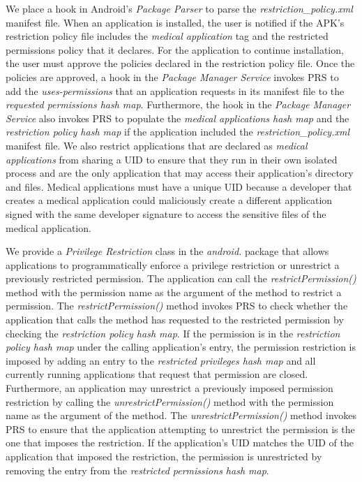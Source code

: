 We place a hook in Android's \textit{Package Parser} to parse the
\textit{restriction\_policy.xml} manifest file. When an application is
installed, the user is notified if the APK's restriction policy file includes
the \textit{medical application} tag and the restricted permissions policy that
it declares. For the application to continue installation, the user must
approve the policies declared in the restriction policy file.  Once the
policies are approved, a hook in the \textit{Package Manager Service} invokes
PRS to add the \textit{uses-permissions} that an application requests in its
manifest file to the \textit{requested permissions hash map}.  Furthermore, the
hook in the \textit{Package Manager Service} also invokes PRS to populate the
\textit{medical applications hash map} and the \textit{restriction policy hash
map} if the application included the \textit{restriction\_policy.xml} manifest
file.  We also restrict applications that are declared as \textit{medical
applications} from sharing a UID to ensure that they run in their own isolated
process and are the only application that may access their application's
directory and files.  Medical applications must have a unique UID because a
developer that creates a medical application could maliciously create a
different application signed with the same developer signature to access the
sensitive files of the medical application.

We provide a \textit{Privilege Restriction} class in the \textit{android.}
package that allows applications to programmatically enforce a privilege
restriction or unrestrict a previously restricted permission.  The application
can call the \textit{restrictPermission()} method with the permission name as
the argument of the method to restrict a permission.  The
\textit{restrictPermission()} method invokes PRS to check whether the
application that calls the method has requested to the restricted permission by
checking the \textit{restriction policy hash map}.  If the permission is in the
\textit{restriction policy hash map} under the calling application's entry, the
permission restriction is imposed by adding an entry to the \textit{restricted
privileges hash map} and all currently running applications that request that
permission are closed.  Furthermore, an application may unrestrict a previously
imposed permission restriction by calling the \textit{unrestrictPermission()}
method with the permission name as the argument of the method.  The
\textit{unrestrictPermission()} method invokes PRS to ensure that the
application attempting to unrestrict the permission is the one that imposes the
restriction.  If the application's UID matches the UID of the application that
imposed the restriction, the permission is unrestricted by removing the entry
from the \textit{restricted permissions hash map}.

